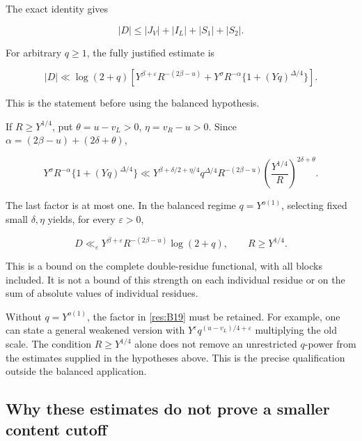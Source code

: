\documentclass[11pt]{article}
\numberwithin{equation}{section}
\begin{document}
The exact identity gives

\begin{equation}\label{res:B17}
|D|\leq |J_V|+|I_L|+|S_1|+|S_2|.
\end{equation}

For arbitrary \(q\geq1\), the fully justified estimate is

\begin{equation}\label{res:B18}
|D|\ll\log(2+q)\left[
 Y^{\beta+\varepsilon}R^{-(2\beta-u)}
 +Y^\sigma R^{-\alpha}\{1+(Yq)^{\Delta/4}\}\right].
\end{equation}

This is the statement before using the balanced hypothesis.

If \(R\geq Y^{1/4}\), put \(\theta=u-v_L>0\), \(\eta=v_R-u>0\). Since
\(\alpha=(2\beta-u)+(2\delta+\theta)\),

\begin{equation}\label{res:B19}
Y^\sigma R^{-\alpha}\{1+(Yq)^{\Delta/4}\}
 \ll
 Y^{\beta+\delta/2+\eta/4}q^{\Delta/4}
 R^{-(2\beta-u)}
 \left(\frac{Y^{1/4}}R\right)^{2\delta+\theta}.
\end{equation}

The last factor is at most one. In the balanced regime \(q=Y^{o(1)}\),
selecting fixed small \(\delta,\eta\) yields, for every
\(\varepsilon>0\),

\begin{equation}\label{res:B20}
\boxed{\quad
 D\ll_\varepsilon
 Y^{\beta+\varepsilon}R^{-(2\beta-u)}\log(2+q),
 \qquad R\geq Y^{1/4}.
 \quad}
\end{equation}

This is a bound on the complete double-residue functional, with all
blocks included. It is not a bound of this strength on each individual
residue or on the sum of absolute values of individual residues.

Without \(q=Y^{o(1)}\), the factor in \eqref{res:B19} must be retained.
For example, one can state a general weakened version with
\(Y^\varepsilon q^{(u-v_L)/4+\varepsilon}\) multiplying the old scale.
The condition \(R\geq Y^{1/4}\) alone does not remove an unrestricted
\(q\)-power from the estimates supplied in the hypotheses above. This is
the precise qualification outside the balanced application.

\subsection{Why these estimates do not prove a smaller content
cutoff}\label{why-these-estimates-do-not-prove-a-smaller-content-cutoff}
\end{document}
